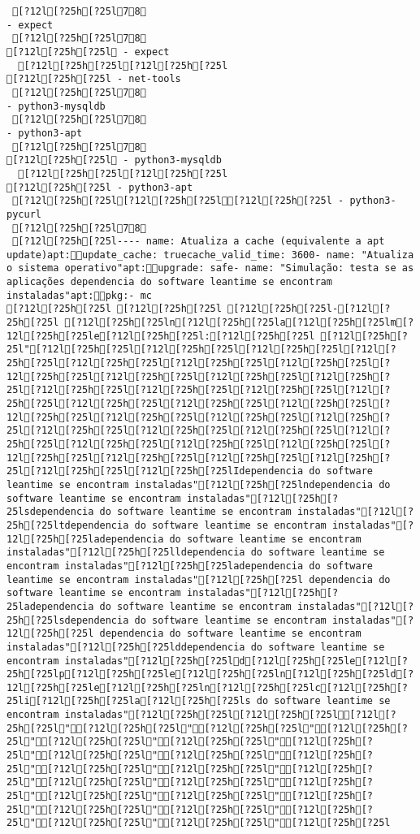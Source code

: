 \documentclass{scrartcl}
\begin{document}
\begin{Verbatim}
 [?12l[?25h[?25l78
- expect
 [?12l[?25h[?25l78
[?12l[?25h[?25l - expect
  [?12l[?25h[?25l[?12l[?25h[?25l
[?12l[?25h[?25l - net-tools
 [?12l[?25h[?25l78
- python3-mysqldb
 [?12l[?25h[?25l78
- python3-apt
 [?12l[?25h[?25l78
[?12l[?25h[?25l - python3-mysqldb
  [?12l[?25h[?25l[?12l[?25h[?25l
[?12l[?25h[?25l - python3-apt
 [?12l[?25h[?25l[?12l[?25h[?25l[?12l[?25h[?25l - python3-pycurl
 [?12l[?25h[?25l78
 [?12l[?25h[?25l---- name: Atualiza a cache (equivalente a apt update)apt:update_cache: truecache_valid_time: 3600- name: "Atualiza o sistema operativo"apt:upgrade: safe- name: "Simulação: testa se as aplicações dependencia do software leantime se encontram instaladas"apt:pkg:- mc
[?12l[?25h[?25l [?12l[?25h[?25l [?12l[?25h[?25l-[?12l[?25h[?25l [?12l[?25h[?25ln[?12l[?25h[?25la[?12l[?25h[?25lm[?12l[?25h[?25le[?12l[?25h[?25l:[?12l[?25h[?25l [?12l[?25h[?25l"[?12l[?25h[?25l[?12l[?25h[?25l[?12l[?25h[?25l[?12l[?25h[?25l[?12l[?25h[?25l[?12l[?25h[?25l[?12l[?25h[?25l[?12l[?25h[?25l[?12l[?25h[?25l[?12l[?25h[?25l[?12l[?25h[?25l[?12l[?25h[?25l[?12l[?25h[?25l[?12l[?25h[?25l[?12l[?25h[?25l[?12l[?25h[?25l[?12l[?25h[?25l[?12l[?25h[?25l[?12l[?25h[?25l[?12l[?25h[?25l[?12l[?25h[?25l[?12l[?25h[?25l[?12l[?25h[?25l[?12l[?25h[?25l[?12l[?25h[?25l[?12l[?25h[?25l[?12l[?25h[?25l[?12l[?25h[?25l[?12l[?25h[?25l[?12l[?25h[?25l[?12l[?25h[?25l[?12l[?25h[?25l[?12l[?25h[?25l[?12l[?25h[?25l[?12l[?25h[?25lIdependencia do software leantime se encontram instaladas"[?12l[?25h[?25lndependencia do software leantime se encontram instaladas"[?12l[?25h[?25lsdependencia do software leantime se encontram instaladas"[?12l[?25h[?25ltdependencia do software leantime se encontram instaladas"[?12l[?25h[?25ladependencia do software leantime se encontram instaladas"[?12l[?25h[?25lldependencia do software leantime se encontram instaladas"[?12l[?25h[?25ladependencia do software leantime se encontram instaladas"[?12l[?25h[?25l dependencia do software leantime se encontram instaladas"[?12l[?25h[?25ladependencia do software leantime se encontram instaladas"[?12l[?25h[?25lsdependencia do software leantime se encontram instaladas"[?12l[?25h[?25l dependencia do software leantime se encontram instaladas"[?12l[?25h[?25lddependencia do software leantime se encontram instaladas"[?12l[?25h[?25ld[?12l[?25h[?25le[?12l[?25h[?25lp[?12l[?25h[?25le[?12l[?25h[?25ln[?12l[?25h[?25ld[?12l[?25h[?25le[?12l[?25h[?25ln[?12l[?25h[?25lc[?12l[?25h[?25li[?12l[?25h[?25la[?12l[?25h[?25ls do software leantime se encontram instaladas"[?12l[?25h[?25l[?12l[?25h[?25l[?12l[?25h[?25l"[?12l[?25h[?25l"[?12l[?25h[?25l"[?12l[?25h[?25l"[?12l[?25h[?25l"[?12l[?25h[?25l"[?12l[?25h[?25l"[?12l[?25h[?25l"[?12l[?25h[?25l"[?12l[?25h[?25l"[?12l[?25h[?25l"[?12l[?25h[?25l"[?12l[?25h[?25l"[?12l[?25h[?25l"[?12l[?25h[?25l"[?12l[?25h[?25l"[?12l[?25h[?25l"[?12l[?25h[?25l"[?12l[?25h[?25l"[?12l[?25h[?25l"[?12l[?25h[?25l"[?12l[?25h[?25l"[?12l[?25h[?25l"[?12l[?25h[?25l"[?12l[?25h[?25l

\end{Verbatim}
\end{document}

